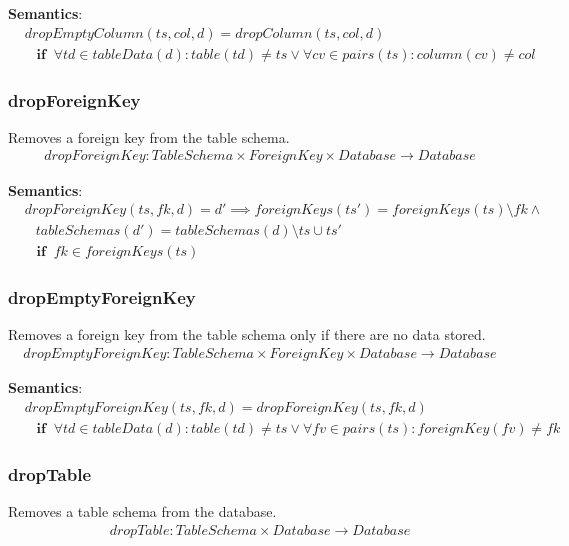 \documentclass[10pt]{article}
\begin{document}
\noindent \textbf{Semantics}:
\begin{align}
& dropEmptyColumn(ts, col, d) = dropColumn(ts, col, d)  \nonumber \\
& \;\;\; \mathbf{if}  \;\; \forall td \in tableData(d) : table(td) \neq ts \lor \forall cv \in pairs(ts) : column(cv) \neq col
\end{align}


\subsubsection{dropForeignKey}
Removes a foreign key from the table schema.
\begin{align}
dropForeignKey: TableSchema \times ForeignKey \times Database \rightarrow Database
\end{align}

\noindent \textbf{Semantics}:
\begin{align}
& dropForeignKey(ts, fk, d) = d' \implies foreignKeys(ts') = foreignKeys(ts) \setminus fk \land \nonumber \\
& \;\;\ tableSchemas(d') = tableSchemas(d) \setminus ts \cup ts'  \nonumber \\
& \;\;\; \mathbf{if}  \;\; fk \in foreignKeys(ts)
\end{align}

\subsubsection{dropEmptyForeignKey}
Removes a foreign key from the table schema only if there are no data stored.
\begin{align}
dropEmptyForeignKey: TableSchema \times ForeignKey \times Database \rightarrow Database
\end{align}

\noindent \textbf{Semantics}:
\begin{align}
& dropEmptyForeignKey(ts, fk, d) = dropForeignKey(ts, fk, d) \nonumber \\
& \;\;\; \mathbf{if}  \;\;  \forall td \in tableData(d) : table(td) \neq ts \lor \forall fv \in pairs(ts) : foreignKey(fv) \neq fk
\end{align}

\subsubsection{dropTable}
Removes a table schema from the database.
\begin{align}
dropTable: TableSchema \times Database \rightarrow Database
\end{align}
\end{document}
